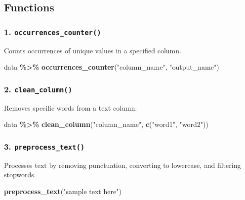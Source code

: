 \documentclass[
]{article}
\newenvironment{Shaded}{\begin{snugshade}}{\end{snugshade}}
\newcommand{\FunctionTok}[1]{\textcolor[rgb]{0.13,0.29,0.53}{\textbf{#1}}}
\newcommand{\NormalTok}[1]{#1}
\newcommand{\SpecialCharTok}[1]{\textcolor[rgb]{0.81,0.36,0.00}{\textbf{#1}}}
\newcommand{\StringTok}[1]{\textcolor[rgb]{0.31,0.60,0.02}{#1}}
\begin{document}
\subsection{Functions}\label{functions}

\subsubsection{\texorpdfstring{1.
\texttt{occurrences\_counter()}}{1. occurrences\_counter()}}\label{occurrences_counter}

Counts occurrences of unique values in a specified column.

\begin{Shaded}
\begin{Highlighting}[]
\NormalTok{data }\SpecialCharTok{\%\textgreater{}\%} \FunctionTok{occurrences\_counter}\NormalTok{(}\StringTok{"column\_name"}\NormalTok{, }\StringTok{"output\_name"}\NormalTok{)}
\end{Highlighting}
\end{Shaded}

\subsubsection{\texorpdfstring{2.
\texttt{clean\_column()}}{2. clean\_column()}}\label{clean_column}

Removes specific words from a text column.

\begin{Shaded}
\begin{Highlighting}[]
\NormalTok{data }\SpecialCharTok{\%\textgreater{}\%} \FunctionTok{clean\_column}\NormalTok{(}\StringTok{"column\_name"}\NormalTok{, }\FunctionTok{c}\NormalTok{(}\StringTok{"word1"}\NormalTok{, }\StringTok{"word2"}\NormalTok{))}
\end{Highlighting}
\end{Shaded}

\subsubsection{\texorpdfstring{3.
\texttt{preprocess\_text()}}{3. preprocess\_text()}}\label{preprocess_text}

Processes text by removing punctuation, converting to lowercase, and
filtering stopwords.

\begin{Shaded}
\begin{Highlighting}[]
\FunctionTok{preprocess\_text}\NormalTok{(}\StringTok{"sample text here"}\NormalTok{)}
\end{Highlighting}
\end{Shaded}
\end{document}
